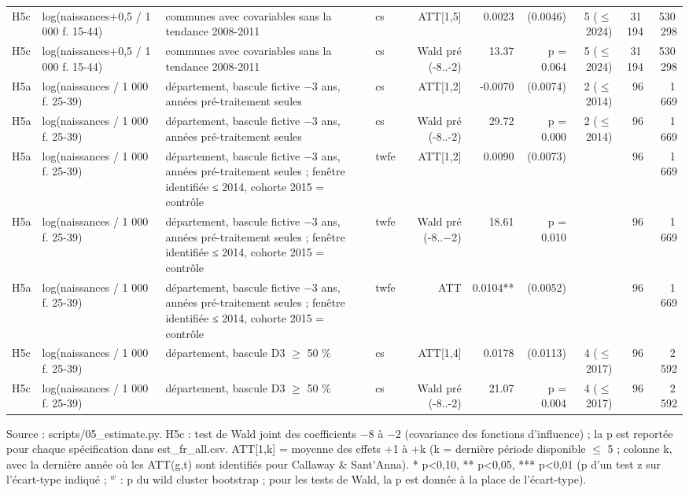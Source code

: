 \begin{table}
\begin{threeparttable}
\begin{tabular}{lp{4.1cm}p{7.2cm}lrrrrrr}
H5c & log(naissances+0,5 / 1 000 f. 15-44) & communes avec covariables sans la tendance 2008-2011 & cs & ATT[1,5] & 0.0023 & (0.0046) & 5 ($\leq$ 2024) & 31\,194 & 530\,298 \\
H5c & log(naissances+0,5 / 1 000 f. 15-44) & communes avec covariables sans la tendance 2008-2011 & cs & Wald pré (-8..-2) & 13.37 & p = 0.064 & 5 ($\leq$ 2024) & 31\,194 & 530\,298 \\
H5a & log(naissances / 1 000 f. 25-39) & département, bascule fictive $-$3 ans, années pré-traitement seules & cs & ATT[1,2] & -0.0070 & (0.0074) & 2 ($\leq$ 2014) & 96 & 1\,669 \\
H5a & log(naissances / 1 000 f. 25-39) & département, bascule fictive $-$3 ans, années pré-traitement seules & cs & Wald pré (-8..-2) & 29.72 & p = 0.000 & 2 ($\leq$ 2014) & 96 & 1\,669 \\
H5a & log(naissances / 1 000 f. 25-39) & département, bascule fictive $-$3 ans, années pré-traitement seules ; fenêtre identifiée ≤ 2014, cohorte 2015 = contrôle & twfe & ATT[1,2] & 0.0090 & (0.0073) &  & 96 & 1\,669 \\
H5a & log(naissances / 1 000 f. 25-39) & département, bascule fictive $-$3 ans, années pré-traitement seules ; fenêtre identifiée ≤ 2014, cohorte 2015 = contrôle & twfe & Wald pré (-8..$-$2) & 18.61 & p = 0.010 &  & 96 & 1\,669 \\
H5a & log(naissances / 1 000 f. 25-39) & département, bascule fictive $-$3 ans, années pré-traitement seules ; fenêtre identifiée ≤ 2014, cohorte 2015 = contrôle & twfe & ATT & 0.0104** & (0.0052) &  & 96 & 1\,669 \\
H5c & log(naissances / 1 000 f. 25-39) & département, bascule D3 $\geq$ 50 \% & cs & ATT[1,4] & 0.0178 & (0.0113) & 4 ($\leq$ 2017) & 96 & 2\,592 \\
H5c & log(naissances / 1 000 f. 25-39) & département, bascule D3 $\geq$ 50 \% & cs & Wald pré (-8..-2) & 21.07 & p = 0.004 & 4 ($\leq$ 2017) & 96 & 2\,592 \\
\bottomrule
\end{tabular}
\begin{tablenotes}\footnotesize
\item Source : scripts/05\_estimate.py. H5c : test de Wald joint des coefficients $-8$ à $-2$ (covariance des fonctions d'influence) ; la p est reportée pour chaque spécification dans est\_fr\_all.csv. ATT[1,k] = moyenne des effets +1 à +k (k = dernière période disponible $\leq$ 5 ; colonne k, avec la dernière année où les ATT(g,t) sont identifiés pour Callaway \& Sant'Anna). * p<0,10, ** p<0,05, *** p<0,01 (p d'un test z sur l'écart-type indiqué ; $^{w}$ : p du wild cluster bootstrap ; pour les tests de Wald, la p est donnée à la place de l'écart-type).
\end{tablenotes}
\end{threeparttable}
\end{table}
